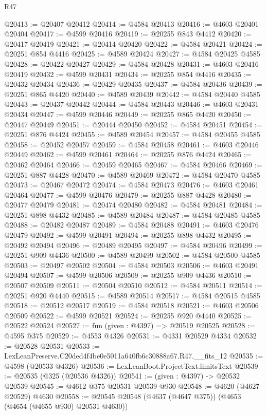 \begin{lexlean}{R47}
\begin{coremodule}
@20413 := @20407 @20412
@20414 := @4584 @20413
@20416 := @4603 @20401 @20404
@20417 := @4599 @20416
@20419 := @20255 @843 @4412
@20420 := @20417 @20419
@20421 := @20414 @20420
@20422 := @4584 @20421
@20424 := @20251 @854 @4416
@20425 := @4589 @20424
@20427 := @4584 @20425 @4585
@20428 := @20422 @20427
@20429 := @4584 @20428
@20431 := @4603 @20416 @20419
@20432 := @4599 @20431
@20434 := @20255 @854 @4416
@20435 := @20432 @20434
@20436 := @20429 @20435
@20437 := @4584 @20436
@20439 := @20251 @865 @4420
@20440 := @4589 @20439
@20442 := @4584 @20440 @4585
@20443 := @20437 @20442
@20444 := @4584 @20443
@20446 := @4603 @20431 @20434
@20447 := @4599 @20446
@20449 := @20255 @865 @4420
@20450 := @20447 @20449
@20451 := @20444 @20450
@20452 := @4584 @20451
@20454 := @20251 @876 @4424
@20455 := @4589 @20454
@20457 := @4584 @20455 @4585
@20458 := @20452 @20457
@20459 := @4584 @20458
@20461 := @4603 @20446 @20449
@20462 := @4599 @20461
@20464 := @20255 @876 @4424
@20465 := @20462 @20464
@20466 := @20459 @20465
@20467 := @4584 @20466
@20469 := @20251 @887 @4428
@20470 := @4589 @20469
@20472 := @4584 @20470 @4585
@20473 := @20467 @20472
@20474 := @4584 @20473
@20476 := @4603 @20461 @20464
@20477 := @4599 @20476
@20479 := @20255 @887 @4428
@20480 := @20477 @20479
@20481 := @20474 @20480
@20482 := @4584 @20481
@20484 := @20251 @898 @4432
@20485 := @4589 @20484
@20487 := @4584 @20485 @4585
@20488 := @20482 @20487
@20489 := @4584 @20488
@20491 := @4603 @20476 @20479
@20492 := @4599 @20491
@20494 := @20255 @898 @4432
@20495 := @20492 @20494
@20496 := @20489 @20495
@20497 := @4584 @20496
@20499 := @20251 @909 @4436
@20500 := @4589 @20499
@20502 := @4584 @20500 @4585
@20503 := @20497 @20502
@20504 := @4584 @20503
@20506 := @4603 @20491 @20494
@20507 := @4599 @20506
@20509 := @20255 @909 @4436
@20510 := @20507 @20509
@20511 := @20504 @20510
@20512 := @4584 @20511
@20514 := @20251 @920 @4440
@20515 := @4589 @20514
@20517 := @4584 @20515 @4585
@20518 := @20512 @20517
@20519 := @4584 @20518
@20521 := @4603 @20506 @20509
@20522 := @4599 @20521
@20524 := @20255 @920 @4440
@20525 := @20522 @20524
@20527 := fun (given : @4397) => @20519 @20525
@20528 := @4595 @375
@20529 := @4553 @4326
@20531 := @4331 @20529 @4334
@20532 := @20528 @20531
@20533 := LexLeanPreserve.C20ded4f4be0e5011a640fb6c30888a67.R47.__fits_12
@20535 := @4598 (@20533 @4326)
@20536 := LexLeanBoot.ProjectText.limitsText
@20539 := @20535 (@325 (@20536 @4326))
@20541 := (given : @4397) -> @20532 @20539
@20545 := @4612 @375 @20531 @20539 @930
@20548 := @4620 (@4627 @20529) @4630
@20558 := @20545 @20548 (@4637 (@4647 @375)) (@4653 (@4654 (@4655 @930) @20531 @4630))

\end{coremodule}
\end{lexlean}
